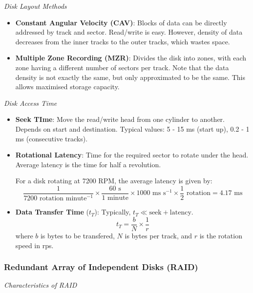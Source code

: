 {\emph{Disk Layout Methods}
\begin{itemize}
    \item \textbf{Constant Angular Velocity (CAV)}: Blocks of data can be directly addressed
        by track and sector. Read/write is easy. However, density of data decreases from the
        inner tracks to the outer tracks, which wastes space.
    \item \textbf{Multiple Zone Recording (MZR)}: Divides the disk into zones, with each zone
        having a different number of sectors per track. Note that the data density is not
        exactly the same, but only approximated to be the same. This allows maximised storage
        capacity.
\end{itemize}
}%

\pagebreak

\emph{Disk Access Time}

\begin{itemize}
    \item \textbf{Seek TIme}: Move the read/write head from one cylinder to another.
        Depends on start and destination. Typical values: 5 - 15 ms (start up), 0.2 - 1 ms
        (consecutive tracks).
    \item \textbf{Rotational Latency}: Time for the required sector to rotate under the head.
        Average latency is the time for half a revolution.
        \begin{example}
            For a disk rotating at 7200 RPM, the average latency is given by: \[
                \frac{1}{7200 \text{ rotation minute}^{-1}}
                \times \frac{60\text{ s}}{1\text{ minute}}
                \times 1000 \text{ ms s}^{-1}
                \times \frac{1}{2} \text{ rotation} = \boxed{4.17 \text{ ms}}
            \]
        \end{example}
    \item \textbf{Data Transfer Time} ($t_T$): Typically, $t_T \ll \text{seek} + \text{latency}$.
        \[
            t_T = \frac{b}{N} \times \frac{1}{r} 
        \]
        where $b$ is bytes to be transfered, $N$ is bytes per track, and $r$ is the rotation
        speed in rps.
\end{itemize}

\subsubsection{Redundant Array of Independent Disks (RAID)}

\emph{Characteristics of RAID}

